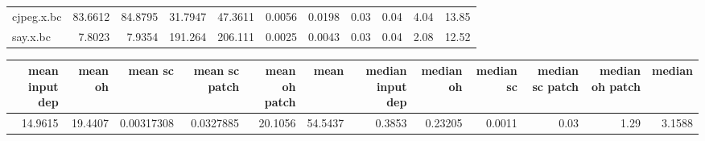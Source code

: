 \begin{tabular}{lrrrrrrrrrr}
 cjpeg.x.bc           &         83.6612 &         84.8795 &  31.7947 &  47.3611 &   0.0056 &   0.0198 &           0.03 &           0.04 &           4.04 &          13.85 \\
 say.x.bc             &          7.8023 &          7.9354 & 191.264  & 206.111  &   0.0025 &   0.0043 &           0.03 &           0.04 &           2.08 &          12.52 \\
\hline
\end{tabular}\begin{tabular}{rrrrrrrrrrrr}
\hline
   mean input dep &   mean oh &    mean sc &   mean sc patch &   mean oh patch &    mean &   median input dep &   median oh &   median sc &   median sc patch &   median oh patch &   median \\
\hline
          14.9615 &   19.4407 & 0.00317308 &       0.0327885 &         20.1056 & 54.5437 &             0.3853 &     0.23205 &      0.0011 &              0.03 &              1.29 &   3.1588 \\
\hline
\end{tabular}

